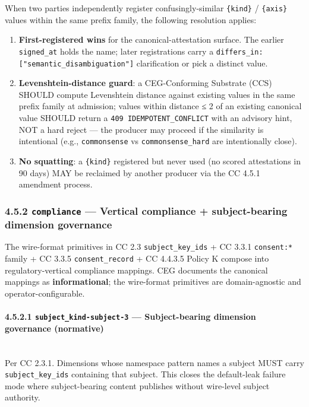 \documentclass[11pt]{article}
\begin{document}
When two parties independently register confusingly-similar \texttt{\{kind\}} / \texttt{\{axis\}} values within the same prefix family, the following resolution applies:


\begin{enumerate}\setlength\itemsep{0pt}
\item \textbf{First-registered wins} for the canonical-attestation surface. The earlier \texttt{signed\_at} holds the name; later registrations carry a \texttt{differs\_in: ["semantic\_disambiguation"]} clarification or pick a distinct value.
\item \textbf{Levenshtein-distance guard}: a CEG-Conforming Substrate (CCS) SHOULD compute Levenshtein distance against existing values in the same prefix family at admission; values within distance ≤ 2 of an existing canonical value SHOULD return a \texttt{409 IDEMPOTENT\_CONFLICT} with an advisory hint, NOT a hard reject — the producer may proceed if the similarity is intentional (e.g., \texttt{commonsense} vs \texttt{commonsense\_hard} are intentionally close).
\item \textbf{No squatting}: a \texttt{\{kind\}} registered but never used (no scored attestations in 90 days) MAY be reclaimed by another producer via the CC 4.5.1 amendment process.
\end{enumerate}


\subsubsection*{4.5.2 \texttt{compliance} — Vertical compliance + subject-bearing dimension governance}


The wire-format primitives in CC 2.3 \texttt{subject\_key\_ids} + CC 3.3.1 \texttt{consent:*} family + CC 3.3.5 \texttt{consent\_record} + CC 4.4.3.5 Policy K compose into regulatory-vertical compliance mappings. CEG documents the canonical mappings as \textbf{informational}; the wire-format primitives are domain-agnostic and operator-configurable.


\paragraph{4.5.2.1 \texttt{subject\_kind-subject-3} — Subject-bearing dimension governance (normative)}\mbox{}\\


Per CC 2.3.1. Dimensions whose namespace pattern names a subject MUST carry \texttt{subject\_key\_ids} containing that subject. This closes the default-leak failure mode where subject-bearing content publishes without wire-level subject authority.
\end{document}
